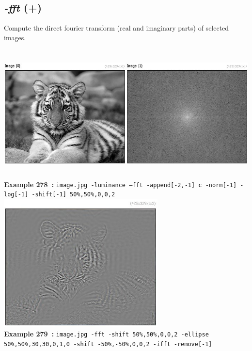 \documentclass[a4paper,11pt,twoside]{book}
\begin{document}
\subsection{\emph{-fft} (+)}\vspace*{-0.5em}
Compute the direct fourier transform (real and imaginary parts) of selected images.
\begin{center}\includegraphics[keepaspectratio=true,height=7cm,width=\textwidth]{img/gmic_def278.jpg}\\
{\footnotesize \textbf{Example 278~:} \texttt{image.jpg -luminance --fft -append[-2,-1] c -norm[-1] -log[-1] -shift[-1] 50\%,50\%,0,0,2}}
\\\includegraphics[keepaspectratio=true,height=7cm,width=\textwidth]{img/gmic_def279.jpg}\\
{\footnotesize \textbf{Example 279~:} \texttt{image.jpg -fft -shift 50\%,50\%,0,0,2 -ellipse 50\%,50\%,30,30,0,1,0 -shift -50\%,-50\%,0,0,2 -ifft -remove[-1]}}
\end{center}
\end{document}
